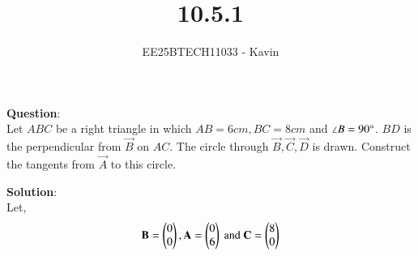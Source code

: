 \documentclass[journal]{IEEEtran}
\begin{document}

\vspace{3cm}

\title{10.5.1}
\author{EE25BTECH11033 - Kavin}
{\let\newpage\relax\maketitle}

\renewcommand{\thefigure}{\theenumi}
\renewcommand{\thetable}{\theenumi}
\setlength{\intextsep}{10pt} %
\textbf{Question}:\\
Let $ABC$ be a right triangle in which $AB = 6 cm, BC = 8 cm$ and $\angle B = 90\degree$. $BD$ is the perpendicular from $\vec{B}$ on $AC$. The circle through $\vec{B}, \vec{C}, \vec{D}$ is drawn. Construct the tangents from $\vec{A}$ to this circle.\\    
\bigskip

\textbf{Solution}:\\

Let,
\begin{align}
    \mathbf{B} = \begin{pmatrix}0\\0\end{pmatrix} , \mathbf{A}=\begin{pmatrix}0\\6\end{pmatrix} \text{ and } \mathbf{C} = \begin{pmatrix}8\\0\end{pmatrix}
\end{align}
\end{document}
